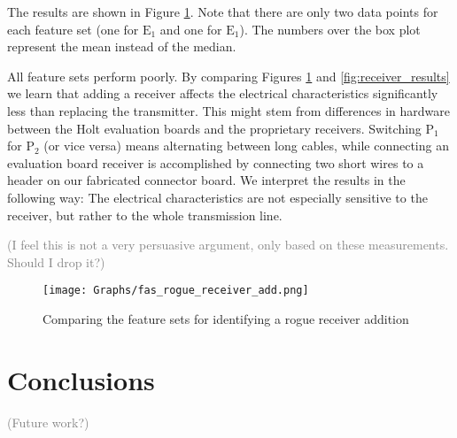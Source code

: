 \documentclass[conference]{IEEEtran}
\begin{document}
  The results are shown in Figure \ref{fig:load_results}. Note that there are only two data points for each feature set (one for \(\text{E}_1\) and one for \(\text{E}_1\)). The numbers over the box plot represent the mean instead of the median.
  
  All feature sets perform poorly. By comparing Figures \ref{fig:load_results} and \ref{fig:receiver_results} we learn that adding a receiver affects the electrical characteristics significantly less than replacing the transmitter. This might stem from differences in hardware between the Holt evaluation boards and the proprietary receivers. Switching \(\text{P}_1\) for \(\text{P}_2\) (or vice versa) means alternating between long cables, while connecting an evaluation board receiver is accomplished by connecting two short wires to a header on our fabricated connector board. We interpret the results in the following way:
  The electrical characteristics are not especially sensitive to the receiver, but rather to the whole transmission line.
  
  \textcolor{gray}{(I feel this is not a very persuasive argument, only based on these measurements. Should I drop it?)}
  
  \begin{figure}[t]
    \centering
    \texttt{[image: Graphs/fas\_rogue\_receiver\_add.png]}
    \caption{Comparing the feature sets for identifying a rogue receiver addition}
    \label{fig:load_results}
  \end{figure}

\section{Conclusions}

  \textcolor{gray}{(Future work?)}


 

\end{document}
